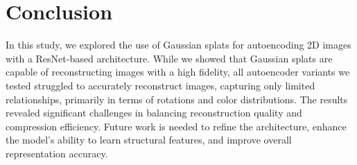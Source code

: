 \section{Conclusion}
\label{sec:conclusion}

In this study, we explored the use of Gaussian splats for autoencoding 2D images with a ResNet-based architecture. While we showed that Gaussian splats are capable of reconstructing images with a high fidelity, all autoencoder variants we tested struggled to accurately reconstruct images, capturing only limited relationships, primarily in terms of rotations and color distributions. The results revealed significant challenges in balancing reconstruction quality and compression efficiency. Future work is needed to refine the architecture, enhance the model’s ability to learn structural features, and improve overall representation accuracy.
